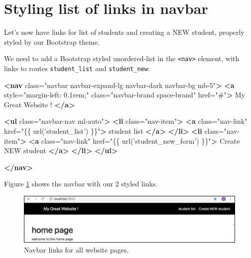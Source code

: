 \documentclass[a4paperpaper,openright]{book}
\newenvironment{Shaded}{}{}
\newcommand{\KeywordTok}[1]{\textcolor[rgb]{0.00,0.44,0.13}{\textbf{#1}}}
\newcommand{\NormalTok}[1]{#1}
\newcommand{\OtherTok}[1]{\textcolor[rgb]{0.00,0.44,0.13}{#1}}
\newcommand{\StringTok}[1]{\textcolor[rgb]{0.25,0.44,0.63}{#1}}
\begin{document}
\hypertarget{styling-list-of-links-in-navbar}{%
\section{Styling list of links in
navbar}\label{styling-list-of-links-in-navbar}}

Let's now have links for list of students and creating a NEW student,
properly styled by our Bootstrap theme.

We need to add a Bootstrap styled unordered-list in the
\texttt{\textless{}nav\textgreater{}} element, with links to routes
\texttt{student\_list} and \texttt{student\_new}:

\begin{Shaded}
\begin{Highlighting}[]
        \KeywordTok{<nav}\OtherTok{ class=}\StringTok{"navbar navbar-expand-lg navbar-dark navbar-bg mb-5"}\KeywordTok{>}
            \KeywordTok{<a}\OtherTok{ style=}\StringTok{"margin-left: 0.1rem;"}\OtherTok{ class=}\StringTok{"navbar-brand space-brand"}\OtherTok{ href=}\StringTok{"#"}\KeywordTok{>}
\NormalTok{                My Great Website !}
            \KeywordTok{</a>}
    
            \KeywordTok{<ul}\OtherTok{ class=}\StringTok{"navbar-nav ml-auto"}\KeywordTok{>}
                \KeywordTok{<li}\OtherTok{ class=}\StringTok{"nav-item"}\KeywordTok{>}
                    \KeywordTok{<a}\OtherTok{ class=}\StringTok{"nav-link"}\OtherTok{ href=}\StringTok{"\{\{ url('student_list') \}\}"}\KeywordTok{>}
\NormalTok{                        student list}
                    \KeywordTok{</a>}
                \KeywordTok{</li>}
                \KeywordTok{<li}\OtherTok{ class=}\StringTok{"nav-item"}\KeywordTok{>}
                    \KeywordTok{<a}\OtherTok{ class=}\StringTok{"nav-link"}\OtherTok{ href=}\StringTok{"\{\{ url('student_new_form') \}\}"}\KeywordTok{>}
\NormalTok{                        Create NEW student}
                    \KeywordTok{</a>}
                \KeywordTok{</li>}
            \KeywordTok{</ul>}
     
        \KeywordTok{</nav>}
\end{Highlighting}
\end{Shaded}

Figure \ref{styled_links} shows the navbar with our 2 styled links.

\begin{figure}
\centering
\includegraphics{./tex2pdf.-51e064f4751cea0e/7ce4ab3158613594bcaaa31601e404c70d3d4ed4.png}
\caption{Navbar links for all website pages. \label{styled_links}}
\end{figure}
\end{document}
